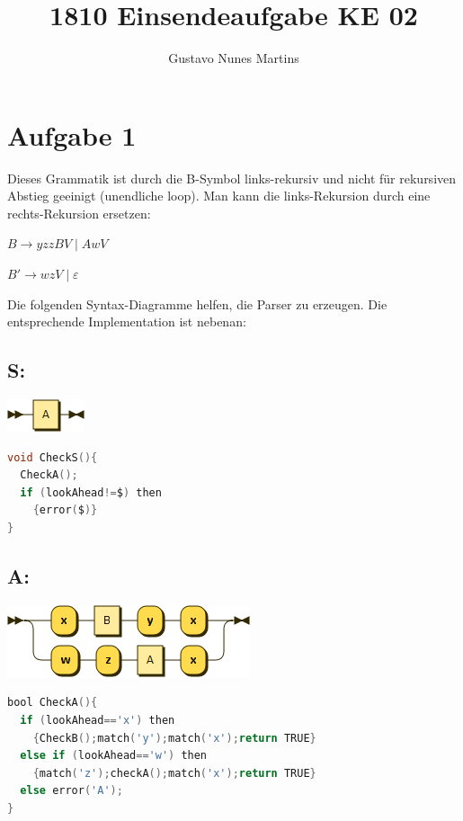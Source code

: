 \documentclass[11pt]{scrartcl}
\title{\textbf{1810 Einsendeaufgabe KE 02}}
\author{Gustavo Nunes Martins}
\begin{document}
	\maketitle
	\section*{Aufgabe 1}
	Dieses Grammatik ist durch die B-Symbol links-rekursiv und nicht für rekursiven Abstieg geeinigt (unendliche loop). Man kann die links-Rekursion durch eine rechts-Rekursion ersetzen:
	
	\begin{center}
	$B \rightarrow yzzBV \mid AwV$
	
	$B' \rightarrow wzV \mid \varepsilon$
	\end{center}
	Die folgenden Syntax-Diagramme helfen, die Parser zu erzeugen. Die entsprechende Implementation ist nebenan:
	\subsection*{S:}
	\begin{minipage}{.4\textwidth}
	\includegraphics[width=0.4\linewidth]{ke-02/diagram/diagram/S}

	\end{minipage}
	\begin{minipage}{0.6\textwidth}
	\begin{lstlisting}[language=C]		
void CheckS(){
  CheckA();
  if (lookAhead!=$) then
    {error($)}
}
	\end{lstlisting}
	\end{minipage}
	\subsection*{A:}
	\begin{minipage}{0.4\textwidth}
	\includegraphics[width=1\linewidth]{ke-02/diagram/diagram/A}
	\end{minipage}
	\begin{minipage}{0.6\textwidth}
		\begin{lstlisting}[language=C]		
bool CheckA(){
  if (lookAhead=='x') then 
    {CheckB();match('y');match('x');return TRUE}
  else if (lookAhead=='w') then 
    {match('z');checkA();match('x');return TRUE}
  else error('A');
}
		\end{lstlisting}
	\end{minipage}	
\end{document}

